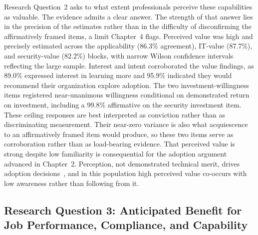 Research Question~2 asks to what extent professionals perceive these capabilities as valuable. The evidence admits a clear answer. The strength of that answer lies in the precision of the estimates rather than in the difficulty of disconfirming the affirmatively framed items, a limit Chapter~4 flags. Perceived value was high and precisely estimated across the applicability (86.3\% agreement), IT-value (87.7\%), and security-value (82.2\%) blocks, with narrow Wilson confidence intervals reflecting the large sample. Interest and intent corroborated the value findings, as 89.0\% expressed interest in learning more and 95.9\% indicated they would recommend their organization explore adoption. The two investment-willingness items registered near-unanimous willingness conditional on demonstrated return on investment, including a 99.8\% affirmative on the security investment item. These ceiling responses are best interpreted as conviction rather than as discriminating measurement. Their near-zero variance is also what acquiescence to an affirmatively framed item would produce, so these two items serve as corroboration rather than as load-bearing evidence. That perceived value is strong despite low familiarity is consequential for the adoption argument advanced in Chapter~2. Perception, not demonstrated technical merit, drives adoption decisions~\parencite{Call_Herber_2022, Call_2024}, and in this population high perceived value co-occurs with low awareness rather than following from it.

\subsection{Research Question 3: Anticipated Benefit for Job Performance, Compliance, and Capability}

